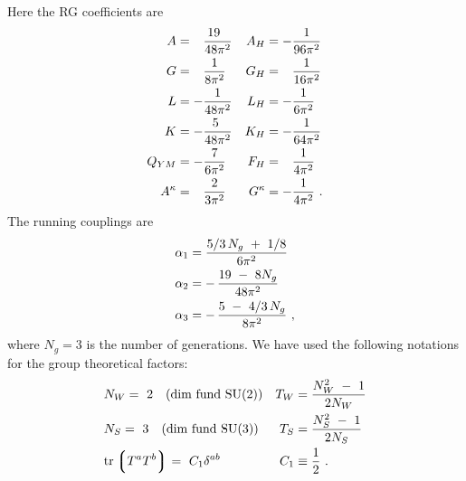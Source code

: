 \documentclass[12pt]{revtex4}
\begin{document}
	Here the RG coefficients are
%
\begin{align}
\notag
	A & = \phantom{-}\frac{19~\;}{48\pi^2}  & A_H      & = - \frac{1}{96\pi^2} \\
\notag
	G & = \phantom{-}\frac{1}{8\pi^2}     &	G_H 	 & = \phantom{-}
							\frac{1}{16\pi^2}	\\
\notag
	L & = - \frac{1}{48\pi^2}  	      &	L_H 	 & = - \frac{1}{6\pi^2}  \\
\notag
	K & = - \frac{5~}{48\pi^2}  	      &	K_H	 & = - \frac{1}{64\pi^2} \\
\notag
	Q_{YM} & =
		- \frac{7}{6\pi^2} 	      &	F_H & = \phantom{-}\frac{1}{4\pi^2} \\
\notag
	A^\kappa & = \phantom{-}
	          \frac{2}{3\pi^2} 	      &   G^\kappa & = - \frac{1}{4\pi^2} 
	~.
\end{align}
	The running couplings are
%
\begin{align}
\notag
	\alpha_1 & =        
			    \frac{5/3\, N_g ~+~ 1/8}
                                        {6\pi^2}  \\
\notag
	\alpha_2 & =    -\, \frac{19 ~-~ 8 N_g}
		                  {48\pi^2}  \\
\notag
	\alpha_3 & =    -\, \frac{5 ~-~4/3\, N_g}
			         {8\pi^2}~,
\end{align}
	where $ N_g = 3 $ is the number of generations.
	We have used the following notations for the group theoretical
	factors:
\begin{align}
\notag
	& N_W = ~2 \quad\text{(dim fund SU(2))} &
		T_W & = \frac{N_W^2 ~-~ 1}
			       {2 N_W}       
	\\
\notag
	& N_S = ~3 \quad\text{(dim fund SU(3))} &
		T_S & = \frac{N_S^2 ~-~ 1}
			       {2 N_S}
	\\
\notag
	& {\rm tr} \left\lgroup T^a T^b \right\rgroup = 
			~C_1 \delta^{ab} &
		C_1 & \equiv \frac{1}{2}~.
\end{align}
\end{document}
